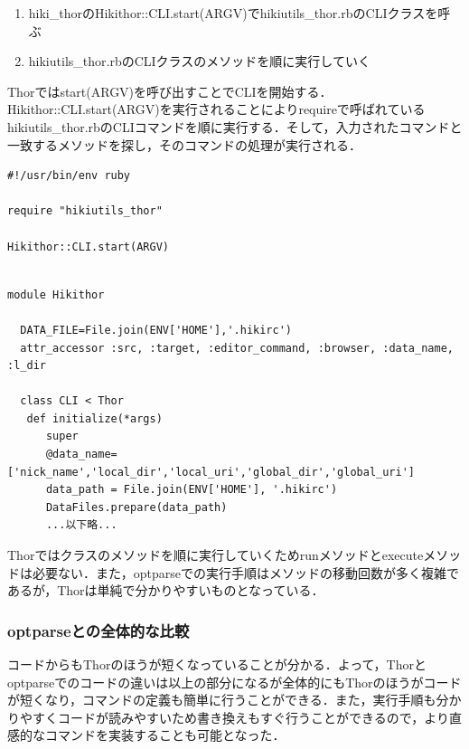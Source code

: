 \begin{enumerate}
\item hiki\_thorのHikithor::CLI.start(ARGV)でhikiutils\_thor.rbのCLIクラスを呼ぶ
\item hikiutils\_thor.rbのCLIクラスのメソッドを順に実行していく
\end{enumerate}
Thorではstart(ARGV)を呼び出すことでCLIを開始する．Hikithor::CLI.start(ARGV)を実行されることによりrequireで呼ばれているhikiutils\_thor.rbのCLIコマンドを順に実行する．そして，入力されたコマンドと一致するメソッドを探し，そのコマンドの処理が実行される．
\begin{lstlisting}[style=customRuby,basicstyle={\scriptsize\ttfamily}]
#!/usr/bin/env ruby                                                             

require "hikiutils_thor"

Hikithor::CLI.start(ARGV)
\end{lstlisting}\begin{lstlisting}[style=customRuby,basicstyle={\scriptsize\ttfamily}]

module Hikithor

  DATA_FILE=File.join(ENV['HOME'],'.hikirc')
  attr_accessor :src, :target, :editor_command, :browser, :data_name, :l_dir

  class CLI < Thor
   def initialize(*args)
      super
      @data_name=['nick_name','local_dir','local_uri','global_dir','global_uri']
      data_path = File.join(ENV['HOME'], '.hikirc')
      DataFiles.prepare(data_path)
      ...以下略...
\end{lstlisting}
Thorではクラスのメソッドを順に実行していくためrunメソッドとexecuteメソッドは必要ない．また，optparseでの実行手順はメソッドの移動回数が多く複雑であるが，Thorは単純で分かりやすいものとなっている．

\subsubsection{optparseとの全体的な比較}
コードからもThorのほうが短くなっていることが分かる．よって，Thorとoptparseでのコードの違いは以上の部分になるが全体的にもThorのほうがコードが短くなり，コマンドの定義も簡単に行うことができる．また，実行手順も分かりやすくコードが読みやすいため書き換えもすぐ行うことができるので，より直感的なコマンドを実装することも可能となった．

